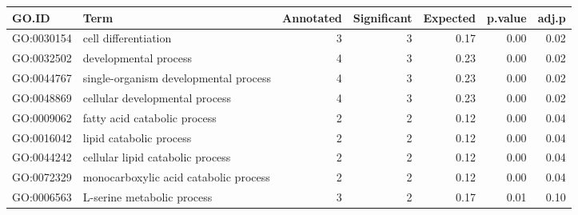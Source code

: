 \begin{table}[ht]
\centering
\begin{tabular}{llrrrrr}
  \hline
GO.ID & Term & Annotated & Significant & Expected & p.value & adj.p \\ 
  \hline
GO:0030154 & cell differentiation &   3 &   3 & 0.17 & 0.00 & 0.02 \\ 
  GO:0032502 & developmental process &   4 &   3 & 0.23 & 0.00 & 0.02 \\ 
  GO:0044767 & single-organism developmental process &   4 &   3 & 0.23 & 0.00 & 0.02 \\ 
  GO:0048869 & cellular developmental process &   4 &   3 & 0.23 & 0.00 & 0.02 \\ 
  GO:0009062 & fatty acid catabolic process &   2 &   2 & 0.12 & 0.00 & 0.04 \\ 
  GO:0016042 & lipid catabolic process &   2 &   2 & 0.12 & 0.00 & 0.04 \\ 
  GO:0044242 & cellular lipid catabolic process &   2 &   2 & 0.12 & 0.00 & 0.04 \\ 
  GO:0072329 & monocarboxylic acid catabolic process &   2 &   2 & 0.12 & 0.00 & 0.04 \\ 
  GO:0006563 & L-serine metabolic process &   3 &   2 & 0.17 & 0.01 & 0.10 \\ 
   \hline
\end{tabular}
\end{table}
